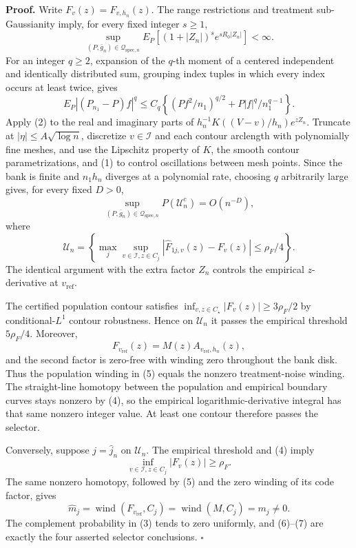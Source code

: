 \textbf{Proof.}
Write \(F_v(z)=F_{v,h_n}(z)\). The range restrictions and treatment sub-Gaussianity imply, for every fixed integer \(s\ge1\),
\[
 \sup_{(P,\bar g_n)\in\mathcal Q_{\mathrm{spec},n}}
 E_P[(1+|Z_n|)^se^{sR_0|Z_n|}]<\infty. \tag{1}
\]
For an integer \(q\ge2\), expansion of the \(q\)-th moment of a centered independent and identically distributed sum, grouping index tuples in which every index occurs at least twice, gives
\[
 E_P|(P_{n_1}-P)f|^q
 \le C_q\left\{(Pf^2/n_1)^{q/2}+P|f|^q/n_1^{q-1}\right\}. \tag{2}
\]
Apply (2) to the real and imaginary parts of \(h_n^{-1}K((V-v)/h_n)e^{zZ_n}\). Truncate at \(|\eta|\le A\sqrt{\log n}\), discretize \(v\in\mathcal I\) and each contour arclength with polynomially fine meshes, and use the Lipschitz property of \(K\), the smooth contour parametrizations, and (1) to control oscillations between mesh points. Since the bank is finite and \(n_1h_n\) diverges at a polynomial rate, choosing \(q\) arbitrarily large gives, for every fixed \(D>0\),
\[
 \sup_{(P,\bar g_n)\in\mathcal Q_{\mathrm{spec},n}}P(\mathcal U_n^c)=O(n^{-D}), \tag{3}
\]
where
\[
 \mathcal U_n=\left\{
 \max_j\sup_{v\in\mathcal I,z\in C_j}
 |\widehat F_{1j,v}(z)-F_v(z)|\le\rho_F/4
 \right\}. \tag{4}
\]
The identical argument with the extra factor \(Z_n\) controls the empirical \(z\)-derivative at \(v_{\mathrm{ref}}\).

The certified population contour satisfies \(\inf_{v,z\in C_\star}|F_v(z)|\ge3\rho_F/2\) by conditional-\(L^1\) contour robustness. Hence on \(\mathcal U_n\) it passes the empirical threshold \(5\rho_F/4\). Moreover,
\[
 F_{v_{\mathrm{ref}}}(z)=M(z)A_{v_{\mathrm{ref}},h_n}(z), \tag{5}
\]
and the second factor is zero-free with winding zero throughout the bank disk. Thus the population winding in (5) equals the nonzero treatment-noise winding. The straight-line homotopy between the population and empirical boundary curves stays nonzero by (4), so the empirical logarithmic-derivative integral has that same nonzero integer value. At least one contour therefore passes the selector.

Conversely, suppose \(j=\widehat j_n\) on \(\mathcal U_n\). The empirical threshold and (4) imply
\[
 \inf_{v\in\mathcal I,z\in C_j}|F_v(z)|\ge\rho_F. \tag{6}
\]
The same nonzero homotopy, followed by (5) and the zero winding of its code factor, gives
\[
 \widehat m_j
 =\operatorname{wind}(F_{v_{\mathrm{ref}}},C_j)
 =\operatorname{wind}(M,C_j)=m_j\ne0. \tag{7}
\]
The complement probability in (3) tends to zero uniformly, and (6)--(7) are exactly the four asserted selector conclusions. \(\square\)
